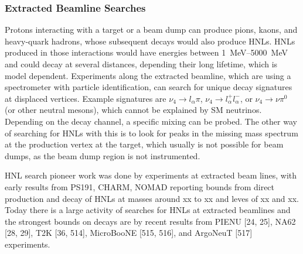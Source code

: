 

\subsubsection{Extracted Beamline Searches}

Protons interacting with a target or a beam dump can produce pions, kaons, and heavy-quark hadrons, whose subsequent decays would also produce HNLs. HNLs produced in those interactions would have energies between \SIrange[range-phrase=~and~]{1}{5000}{\mega\electronvolt} and could decay at several distances, depending their long lifetime, which is model dependent. Experiments along the extracted beamline, which are using a spectrometer with particle identification, can search for unique decay signatures at displaced vertices. Example signatures are $\nu_4 \rightarrow l_\alpha \pi$, $\nu_4 \rightarrow l^+_\alpha l^-_\alpha$, or $\nu_4 \rightarrow \nu \pi^0$ (or other neutral mesons), which cannot be explained by SM neutrinos. Depending on the decay channel, a specific mixing can be probed. The other way of searching for HNLs with this is to look for peaks in the missing mass spectrum at the production vertex at the target, which usually is not possible for beam dumps, as the beam dump region is not instrumented.

HNL search pioneer work was done by experiments at extracted beam lines, with early results from PS191, CHARM, NOMAD reporting bounds from direct production and decay of HNLs at masses around xx to xx and leves of xx and xx. Today there is a large activity of searches for HNLs at extracted beamlines and the strongest bounds on decays are by recent results from PIENU [24, 25], NA62 [28, 29], T2K [36, 514], MicroBooNE [515, 516], and ArgoNeuT [517] experiments.

